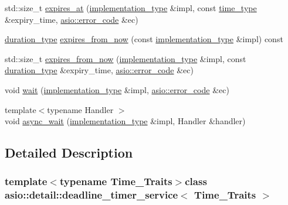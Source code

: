 \begin{DoxyCompactItemize}
std\+::size\+\_\+t \hyperlink{classasio_1_1detail_1_1deadline__timer__service_a8311dad77493ccfbcb16380f68c85ea3}{expires\+\_\+at} (\hyperlink{structasio_1_1detail_1_1deadline__timer__service_1_1implementation__type}{implementation\+\_\+type} \&impl, const \hyperlink{classasio_1_1detail_1_1deadline__timer__service_a217817497abe6136c056c0facdd3f8aa}{time\+\_\+type} \&expiry\+\_\+time, \hyperlink{classasio_1_1error__code}{asio\+::error\+\_\+code} \&ec)
\item 
\hyperlink{classasio_1_1detail_1_1deadline__timer__service_aa2f42592b15216b94578b059efa9b304}{duration\+\_\+type} \hyperlink{classasio_1_1detail_1_1deadline__timer__service_a8972e370a49fc788fe673b94835461c6}{expires\+\_\+from\+\_\+now} (const \hyperlink{structasio_1_1detail_1_1deadline__timer__service_1_1implementation__type}{implementation\+\_\+type} \&impl) const 
\item 
std\+::size\+\_\+t \hyperlink{classasio_1_1detail_1_1deadline__timer__service_acc977f61c1ab001024d76e178c1721a6}{expires\+\_\+from\+\_\+now} (\hyperlink{structasio_1_1detail_1_1deadline__timer__service_1_1implementation__type}{implementation\+\_\+type} \&impl, const \hyperlink{classasio_1_1detail_1_1deadline__timer__service_aa2f42592b15216b94578b059efa9b304}{duration\+\_\+type} \&expiry\+\_\+time, \hyperlink{classasio_1_1error__code}{asio\+::error\+\_\+code} \&ec)
\item 
void \hyperlink{classasio_1_1detail_1_1deadline__timer__service_abe22f0f8f186b5e00d8f9fee667a5a44}{wait} (\hyperlink{structasio_1_1detail_1_1deadline__timer__service_1_1implementation__type}{implementation\+\_\+type} \&impl, \hyperlink{classasio_1_1error__code}{asio\+::error\+\_\+code} \&ec)
\item 
{\footnotesize template$<$typename Handler $>$ }\\void \hyperlink{classasio_1_1detail_1_1deadline__timer__service_af147b64af28c0d36b54849aa36bb492c}{async\+\_\+wait} (\hyperlink{structasio_1_1detail_1_1deadline__timer__service_1_1implementation__type}{implementation\+\_\+type} \&impl, Handler \&handler)
\end{DoxyCompactItemize}


\subsection{Detailed Description}
\subsubsection*{template$<$typename Time\+\_\+\+Traits$>$class asio\+::detail\+::deadline\+\_\+timer\+\_\+service$<$ Time\+\_\+\+Traits $>$}



